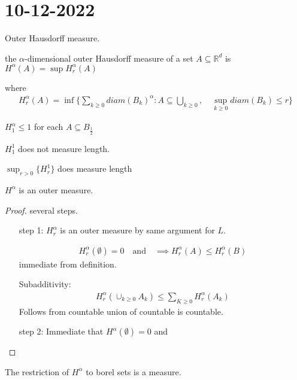\section{10-12-2022}


Outer Hausdorff measure.

the $\alpha$-dimensional outer Hausdorff measure of a set $A \subseteq \mathbb{R}^d$ is $H^{\alpha} (A) = \sup H_{r}^{\alpha} (A)$ 

where
\begin{align*}
	H_{r}^{\alpha} (A) = \inf\{ \sum_{k \geq 0} diam (B_k)^{\alpha} : A \subseteq \bigcup_{k \geq 0}, \quad \sup_{k \geq 0} diam (B_{k} ) \leq r \}
\end{align*}

\begin{example}
	$H_{1}^{\alpha} \leq 1$ for each $A \subseteq B_{\frac{1}{2}}$ 

	$H_{1}^{1}$ does not measure length.

	$\sup_{r > 0} \{H_{r}^{1}\}$ does measure length
\end{example}

\begin{lemma}
	$H^{\alpha}$ is an outer measure.
\end{lemma}

\begin{proof} several steps.
	\begin{enumerate}
		\item[step 1:] $H_{r}^{\alpha}$ is an outer measure by same argument for $L$.

			\begin{align*}
			H_{r}^{\alpha} (\emptyset)= 0 \quad \text{and} \quad \implies H_{r}^{\alpha} (A) \leq H_{r}^{\alpha} (B)
			\end{align*} 
			immediate from definition.

			Subadditivity:
			\begin{align*}
			H_{r}^{\alpha} ( \cup_{k \geq 0} A_{k}) \leq \sum_{K \geq 0} H_{r}^{\alpha} (A_k)
			\end{align*} Follows from countable union of countable is countable.

		\item[step 2:] Immediate that $H^{\alpha} (\emptyset) = 0$ and 
	\end{enumerate}
\end{proof}



\begin{theorem}
	The restriction of $H^{\alpha}$ to borel sets is a measure.
\end{theorem}


